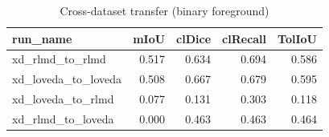 \begin{table}
\caption{Cross-dataset transfer (binary foreground)}
\begin{tabular}{lrrrr}
\toprule
run_name & mIoU & clDice & clRecall & TolIoU \\
\midrule
xd_rlmd_to_rlmd & 0.517 & 0.634 & 0.694 & 0.586 \\
xd_loveda_to_loveda & 0.508 & 0.667 & 0.679 & 0.595 \\
xd_loveda_to_rlmd & 0.077 & 0.131 & 0.303 & 0.118 \\
xd_rlmd_to_loveda & 0.000 & 0.463 & 0.463 & 0.464 \\
\bottomrule
\end{tabular}
\end{table}
